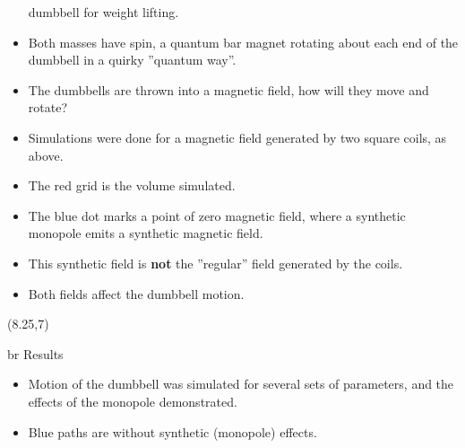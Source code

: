 \documentclass[20pt]{beamer}
\begin{document}
\begin{frame}{}
\begin{textblock}{7.25}
\begin{itemize}[label=\textbullet, leftmargin=25mm]
                   dumbbell for weight lifting.
           \item Both masses have spin, a quantum bar magnet rotating about each end of
                   the dumbbell in a quirky ''quantum way''.
           \item The dumbbells are thrown into a magnetic field, how will they move and
                   rotate?
           \item Simulations were done for a magnetic field generated by two square coils,
                   as above.
           \item The red grid is the volume simulated.
           \item The blue dot marks a point of zero magnetic field, where a synthetic
                   monopole emits a synthetic magnetic
                   field.
           \item This synthetic field is \textbf{not} the ''regular'' field generated by
                   the coils.
           \item Both fields affect the dumbbell motion.
   \end{itemize}

  \end{textblock}
%
%
  \begin{textblock}{7.25}(8.25,7) 
   \begin{beamercolorbox}[wd=\textwidth, sep=7mm, left, rounded=true, shadow=true]{br}
   Results
   \end{beamercolorbox}
   \begin{itemize}[label=\textbullet, leftmargin=25mm]
           \item Motion of the dumbbell was simulated
                   for several sets of parameters, and
                   the effects of the monopole
                   demonstrated.
           \item Blue paths are without synthetic
                   (monopole)  effects.
   \end{itemize}


\end{textblock}
\end{frame}
\end{document}
